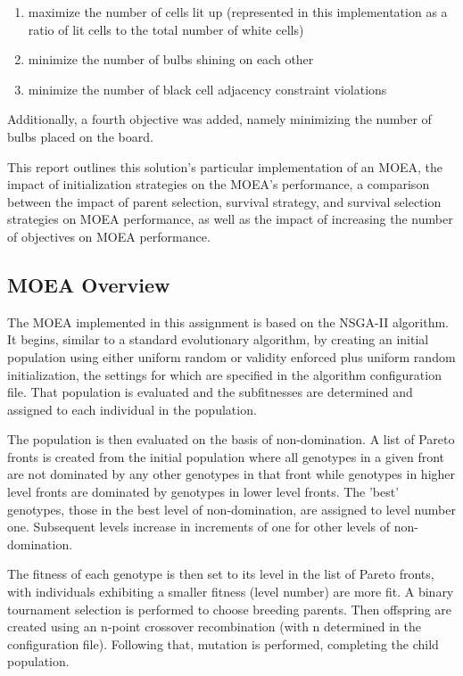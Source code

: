\documentclass[11pt]{article}
\begin{document}
\begin{enumerate}

    \item maximize the number of cells lit up (represented in this implementation
    as a ratio of lit cells to the total number of white cells)

    \item minimize the number of bulbs shining on each other

    \item minimize the number of black cell adjacency constraint violations

\end{enumerate}

Additionally, a fourth objective was added, namely minimizing the number of bulbs
placed on the board.

This report outlines this solution's particular
implementation of an MOEA, the impact of initialization strategies on the MOEA's 
performance, a comparison between the impact of parent selection, survival strategy, and survival
selection strategies on MOEA performance, as well as the impact of increasing the
number of objectives on MOEA performance.


\subsection{MOEA Overview}

The MOEA implemented in this assignment is based on the NSGA-II algorithm. It begins,
similar to a standard evolutionary algorithm, by creating an initial population using
either uniform random or validity enforced plus uniform random initialization, the 
settings for which are specified in the algorithm configuration file. That population
is evaluated and the subfitnesses are determined and assigned to each individual 
in the population.

The population is then evaluated on the basis of non-domination. A list of Pareto fronts is created
from the initial population where all genotypes in a given front are not dominated
by any other genotypes in that front while genotypes in higher level fronts are dominated
by genotypes in lower level fronts. The 'best' genotypes, those in the best level
of non-domination, are assigned to level number one. Subsequent levels increase in
increments of one for other levels of non-domination.

The fitness of each genotype is then set to its level in the list of Pareto fronts, with
individuals exhibiting a smaller fitness (level number) are more fit. A binary tournament selection 
is performed to choose breeding parents. Then offspring are created using an n-point crossover
recombination (with n determined in the configuration file). Following that, mutation is performed,
completing the child population.
\end{document}
